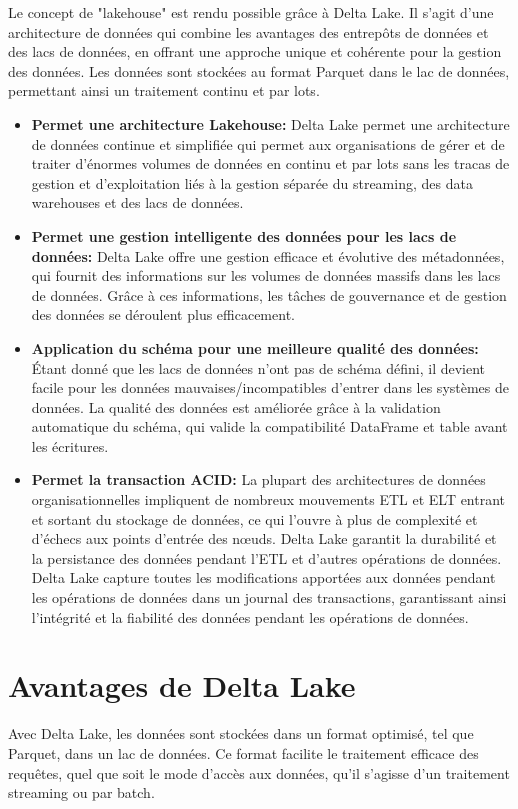 Le concept de "lakehouse" est rendu possible grâce à Delta Lake. Il s'agit d'une architecture de données qui combine les avantages des entrepôts de données et des lacs de données, en offrant une approche unique et cohérente pour la gestion des données. Les données sont stockées au format Parquet dans le lac de données, permettant ainsi un traitement continu et par lots.
\begin{itemize}
    \item \textbf{Permet une architecture Lakehouse:} Delta Lake permet une architecture de données continue et simplifiée qui permet aux organisations de gérer et de traiter d'énormes volumes de données en continu et par lots sans les tracas de gestion et d'exploitation liés à la gestion séparée du streaming, des data warehouses et des lacs de données.
    \item \textbf{Permet une gestion intelligente des données pour les lacs de données:} Delta Lake offre une gestion efficace et évolutive des métadonnées, qui fournit des informations sur les volumes de données massifs dans les lacs de données. Grâce à ces informations, les tâches de gouvernance et de gestion des données se déroulent plus efficacement.
    \item \textbf{Application du schéma pour une meilleure qualité des données:} Étant donné que les lacs de données n'ont pas de schéma défini, il devient facile pour les données mauvaises/incompatibles d'entrer dans les systèmes de données. La qualité des données est améliorée grâce à la validation automatique du schéma, qui valide la compatibilité DataFrame et table avant les écritures.
    \item \textbf{Permet la transaction ACID:} La plupart des architectures de données organisationnelles impliquent de nombreux mouvements ETL et ELT entrant et sortant du stockage de données, ce qui l'ouvre à plus de complexité et d'échecs aux points d'entrée des nœuds. Delta Lake garantit la durabilité et la persistance des données pendant l'ETL et d'autres opérations de données. Delta Lake capture toutes les modifications apportées aux données pendant les opérations de données dans un journal des transactions, garantissant ainsi l'intégrité et la fiabilité des données pendant les opérations de données.
\end{itemize}

\section{Avantages de Delta Lake}
\begin{flushleft}
	Avec Delta Lake, les données sont stockées dans un format optimisé, tel que Parquet, dans un lac de données. Ce format facilite le traitement efficace des requêtes, quel que soit le mode d'accès aux données, qu'il s'agisse d'un traitement streaming ou par batch.
\end{flushleft}

